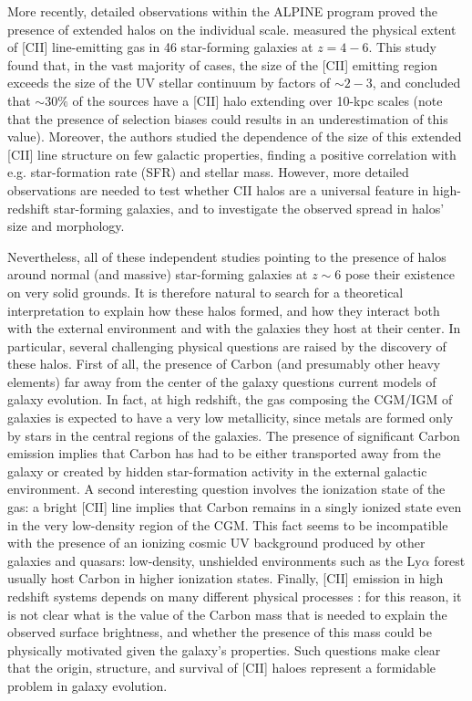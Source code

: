 \documentclass[12pt]{article}
\begin{document}
More recently, detailed observations within the ALPINE program \citep{lefevre:2019, faisst:2019, bethermin:2019} proved the presence of extended halos on the individual scale. \citet{Fujimoto:2020qzo} measured the physical extent of [CII] line-emitting gas in 46 star-forming galaxies at $z=4-6$. This study found that, in the vast majority of cases, the size of the [CII] emitting region exceeds the size of the UV stellar continuum by factors of $\sim 2-3$, and concluded that $\sim 30\%$ of the sources have a [CII] halo extending over 10-kpc scales (note that the presence of selection biases could results in an underestimation of this value). Moreover, the authors studied the dependence of the size of this extended [CII] line structure on few galactic properties, finding a positive correlation with e.g. star-formation rate (SFR) and stellar mass. However, more detailed observations are needed to test whether CII halos are a universal feature in high-redshift star-forming galaxies, and to investigate the observed spread in halos' size and morphology.

Nevertheless, all of these independent studies pointing to the presence of halos around normal (and massive) star-forming galaxies at $z\sim6$ pose their existence on very solid grounds. It is therefore natural to search for a theoretical interpretation to explain how these halos formed, and how they interact both with the external environment and with the galaxies they host at their center. In particular, several challenging physical questions are raised by the discovery of these halos. First of all, the presence of Carbon (and presumably other heavy elements) far away from the center of the galaxy questions current models of galaxy evolution. In fact, at high redshift, the gas composing the CGM/IGM of galaxies is expected to have a very low metallicity, since metals are formed only by stars in the central regions of the galaxies. The presence of significant Carbon emission implies that Carbon has had to be either transported away from the galaxy or created by hidden star-formation activity in the external galactic environment. A second interesting question involves the ionization state of the gas: a bright [CII] line implies that Carbon remains in a singly ionized state even in the very low-density region of the CGM. This fact seems to be incompatible with the presence of an ionizing cosmic UV background produced by other galaxies and quasars: low-density, unshielded environments such as the Ly$\alpha$ forest \citep[e.g.][]{Dodorico13} usually host Carbon in higher ionization states.
Finally, [CII] emission in high redshift systems depends on many different physical processes \citep{pallottini2015, vallini2015, kohandel:2019}: for this reason, it is not clear what is the value of the Carbon mass that is needed to explain the observed surface brightness, and whether the presence of this mass could be physically motivated given the galaxy's properties. Such questions make clear that the origin, structure, and survival of [CII] haloes represent a formidable problem in galaxy evolution.
\end{document}
